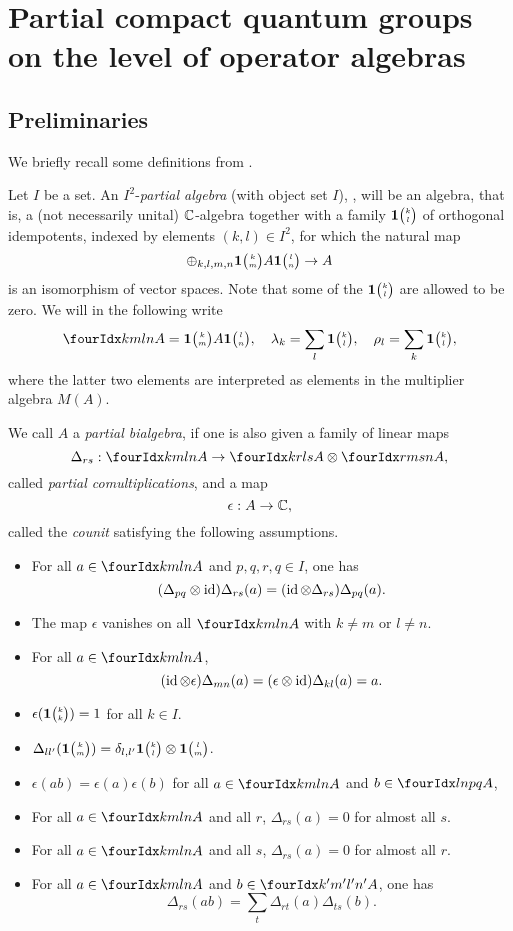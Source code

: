 \section{Partial compact quantum groups on the level of operator algebras}

\subsection{Preliminaries}

We briefly recall some definitions from \cite{DCT1}. 

Let $I$ be a set. An $I^2$-\emph{partial algebra} (with object set $I$), \cite[Definition 1.1]{DCT1}, will be an algebra, that is, a (not necessarily unital) $\mathbb{C}$-algebra together with a family $\mathbf{1}{\tiny {\begin{pmatrix} k\\l\end{pmatrix}}}$ of orthogonal idempotents, indexed by elements $(k,l)\in I^2$, for which the natural map \[\oplus_{k,l,m,n} \mathbf{1}{\tiny {\begin{pmatrix} k\\m\end{pmatrix}}}A\mathbf{1}{\tiny {\begin{pmatrix} l\\n\end{pmatrix}}} \rightarrow A\] is an isomorphism of vector spaces. Note that some of the $\mathbf{1}{\tiny {\begin{pmatrix} k\\l\end{pmatrix}}}$ are allowed to be zero. We will in the following write \[\Gr{A}{k}{l}{m}{n} = \UnitC{k}{m}A\UnitC{l}{n}, \quad \lambda_k = \sum_l \UnitC{k}{l},\quad \rho_l = \sum_k \UnitC{k}{l},\]  where the latter two elements are interpreted as elements in the multiplier algebra $M(A)$. 

We call $A$ a \emph{partial bialgebra}, \cite[Definition 1.5]{DCT1} if one is also given a family of linear maps \[\Delta_{rs}: \Gr{A}{k}{l}{m}{n}\rightarrow \Gr{A}{k}{l}{r}{s} \otimes \Gr{A}{r}{s}{m}{n},\] called \emph{partial comultiplications}, and a map \[\epsilon: A \rightarrow \mathbb{C},\] called the \emph{counit} satisfying the following assumptions.
\begin{itemize}
\item For all $a\in \Gr{A}{k}{l}{m}{n}$ and $p,q,r,q\in I$, one has \[(\Delta_{pq}\otimes \operatorname{id})\Delta_{rs}(a) = (\operatorname{id}\otimes \Delta_{rs})\Delta_{pq}(a).\]
\item The map $\epsilon$ vanishes on all $\Gr{A}{k}{l}{m}{n}$ with $k\neq m$ or $l\neq n$. 
\item For all $a\in \Gr{A}{k}{l}{m}{n}$, \[(\operatorname{id}\otimes \epsilon)\Delta_{mn}(a) = (\epsilon\otimes \operatorname{id})\Delta_{kl}(a) = a.\]
\item $\epsilon(\mathbf{1}{\tiny {\begin{pmatrix} k\\k\end{pmatrix}}})= 1$ for all $k\in I$. 
\item $\Delta_{ll'}(\mathbf{1}{\tiny {\begin{pmatrix} k\\m\end{pmatrix}}}) = \delta_{l,l'} \mathbf{1}{\tiny {\begin{pmatrix} k\\l\end{pmatrix}}}\otimes \mathbf{1}{\tiny {\begin{pmatrix} l\\m\end{pmatrix}}}$.
\item $\epsilon(ab) = \epsilon(a)\epsilon(b)$ for all $a\in \Gr{A}{k}{l}{m}{n}$ and $b\in \Gr{A}{l}{p}{n}{q}$,
\item For all $a\in \Gr{A}{k}{l}{m}{n}$ and all $r$, $\Delta_{rs}(a)=0$ for almost all $s$.
\item For all $a\in \Gr{A}{k}{l}{m}{n}$ and all $s$, $\Delta_{rs}(a)=0$ for almost all $r$.
\item For all $a\in \Gr{A}{k}{l}{m}{n}$ and $b\in \Gr{A}{k'}{l'}{m'}{n'}$, one has \[\Delta_{rs}(ab) = \sum_{t} \Delta_{rt}(a)\Delta_{ts}(b).\]
\end{itemize} 

